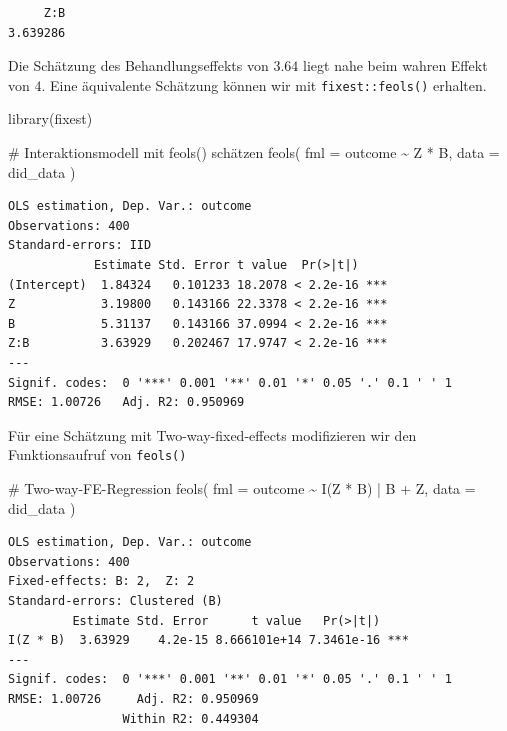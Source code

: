 \documentclass[
  a4paper,
  DIV=11,
  oneside]{scrreprt}
\newenvironment{Shaded}{\begin{snugshade}}{\end{snugshade}}
\newcommand{\AttributeTok}[1]{\textcolor[rgb]{0.40,0.45,0.13}{#1}}
\newcommand{\CommentTok}[1]{\textcolor[rgb]{0.37,0.37,0.37}{#1}}
\newcommand{\FunctionTok}[1]{\textcolor[rgb]{0.28,0.35,0.67}{#1}}
\newcommand{\NormalTok}[1]{\textcolor[rgb]{0.00,0.23,0.31}{#1}}
\newcommand{\SpecialCharTok}[1]{\textcolor[rgb]{0.37,0.37,0.37}{#1}}
\begin{document}
\begin{verbatim}
     Z:B 
3.639286 
\end{verbatim}

Die Schätzung des Behandlungseffekts von \(3.64\) liegt nahe beim wahren
Effekt von \(4\). Eine äquivalente Schätzung können wir mit
\texttt{fixest::feols()} erhalten.

\begin{Shaded}
\begin{Highlighting}[]
\FunctionTok{library}\NormalTok{(fixest)}

\CommentTok{\# Interaktionsmodell mit feols() schätzen}
\FunctionTok{feols}\NormalTok{(}
  \AttributeTok{fml =}\NormalTok{ outcome }\SpecialCharTok{\textasciitilde{}}\NormalTok{ Z }\SpecialCharTok{*}\NormalTok{ B,}
  \AttributeTok{data =}\NormalTok{ did\_data}
\NormalTok{)}
\end{Highlighting}
\end{Shaded}

\begin{verbatim}
OLS estimation, Dep. Var.: outcome
Observations: 400
Standard-errors: IID 
            Estimate Std. Error t value  Pr(>|t|)    
(Intercept)  1.84324   0.101233 18.2078 < 2.2e-16 ***
Z            3.19800   0.143166 22.3378 < 2.2e-16 ***
B            5.31137   0.143166 37.0994 < 2.2e-16 ***
Z:B          3.63929   0.202467 17.9747 < 2.2e-16 ***
---
Signif. codes:  0 '***' 0.001 '**' 0.01 '*' 0.05 '.' 0.1 ' ' 1
RMSE: 1.00726   Adj. R2: 0.950969
\end{verbatim}

Für eine Schätzung mit Two-way-fixed-effects modifizieren wir den
Funktionsaufruf von \texttt{feols()}

\begin{Shaded}
\begin{Highlighting}[]
\CommentTok{\# Two{-}way{-}FE{-}Regression}
\FunctionTok{feols}\NormalTok{(}
  \AttributeTok{fml =}\NormalTok{ outcome }\SpecialCharTok{\textasciitilde{}} \FunctionTok{I}\NormalTok{(Z }\SpecialCharTok{*}\NormalTok{ B) }\SpecialCharTok{|}\NormalTok{ B }\SpecialCharTok{+}\NormalTok{ Z,}
  \AttributeTok{data =}\NormalTok{ did\_data}
\NormalTok{)}
\end{Highlighting}
\end{Shaded}

\begin{verbatim}
OLS estimation, Dep. Var.: outcome
Observations: 400
Fixed-effects: B: 2,  Z: 2
Standard-errors: Clustered (B) 
         Estimate Std. Error      t value   Pr(>|t|)    
I(Z * B)  3.63929    4.2e-15 8.666101e+14 7.3461e-16 ***
---
Signif. codes:  0 '***' 0.001 '**' 0.01 '*' 0.05 '.' 0.1 ' ' 1
RMSE: 1.00726     Adj. R2: 0.950969
                Within R2: 0.449304
\end{verbatim}
\end{document}
